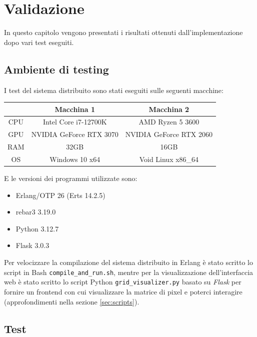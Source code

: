 \documentclass[12pt, a4paper]{report}
\begin{document}
\chapter{Validazione}

In questo capitolo vengono presentati i risultati ottenuti dall'implementazione dopo vari test eseguiti.

\section{Ambiente di testing}

I test del sistema distribuito sono stati eseguiti sulle seguenti macchine:

\begin{table}[H]
    \centering
    \begin{tabular}{c||c|c}
        & Macchina 1 & Macchina 2 \\
        \hline
        CPU & Intel Core i7-12700K & AMD Ryzen 5 3600 \\
        GPU & NVIDIA GeForce RTX 3070 & NVIDIA GeForce RTX 2060 \\
        RAM & 32GB & 16GB \\
        OS & Windows 10 x64 & Void Linux x86\_64 \\
    \end{tabular}
    \label{tab:env}
\end{table}


E le versioni dei programmi utilizzate sono:

\begin{itemize}
    \item Erlang/OTP 26 (Erts 14.2.5)
    \item rebar3 3.19.0
    \item Python 3.12.7
    \item Flask 3.0.3
\end{itemize}

Per velocizzare la compilazione del sistema distribuito in Erlang \`e stato scritto lo script in Bash \texttt{compile\_and\_run.sh}, mentre per la visualizzazione dell'interfaccia web \`e stato scritto lo script Python \texttt{grid\_visualizer.py} basato su \textit{Flask} per fornire un frontend con cui visualizzare la matrice di pixel e poterci interagire (approfondimenti nella sezione \ref{sec:scripts}).

\section{Test}
\end{document}
